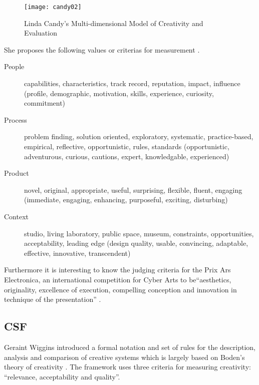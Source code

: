\begin{figure}[!htbp] %
  \centering
  \texttt{[image: candy02]}
\caption[Multi-dimensional Model of Creativity and Evaluation]{Linda Candy's Multi-dimensional Model of Creativity and Evaluation}
\label{fig:candy02}
\end{figure}

She proposes the following values or criterias for measurement \citeyear{Candy2012}.

\begin{description}
  \item [People] capabilities, characteristics, track record, reputation, impact, influence (profile, demographic, motivation, skills, experience, curiosity, commitment)
  \item [Process] problem finding, solution oriented, exploratory, systematic, practice-based, empirical, reflective, opportunistic, rules, standards (opportunistic, adventurous, curious, cautions, expert, knowledgable, experienced)
  \item [Product] novel, original, appropriate, useful, surprising, flexible, fluent, engaging (immediate, engaging, enhancing, purposeful, exciting, disturbing)
  \item [Context] studio, living laboratory, public space, museum, constraints, opportunities, acceptability, leading edge (design quality, usable, convincing, adaptable, effective, innovative, transcendent)
\end{description}

Furthermore it is interesting to know the judging criteria for the Prix Ars Electronica, an international competition for Cyber Arts to be``aesthetics, originality, excellence of execution, compelling conception and innovation in technique of the presentation'' \autocite[cited in][p.18]{Candy2012}.


\subsection{CSF}

Geraint Wiggins introduced a formal notation and set of rules for the description, analysis and comparison of creative systems \citeyear{Wiggins2006} which is largely based on Boden's theory of creativity \citeyear{Boden2003}. The framework uses three criteria for measuring creativity: ``relevance, acceptability and quality''.

